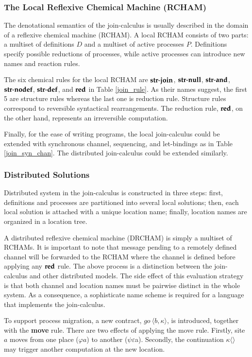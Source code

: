 \subsubsection{The Local Reflexive Chemical Machine (RCHAM)}

The denotational semantics of the join-calculus is usually described in the domain of a reflexive chemical machine (RCHAM).  A local RCHAM consists of two parts:  a multiset of definitions $D$ and a multiset of active processes $P$.  Definitions specify possible reductions of processes, while active processes can introduce new names and reaction rules.  

The six chemical rules for the local RCHAM are $\bf{str\text{-} join}$, $\bf{str\text{-}null}$, $\bf{str\text{-}and}$, $\bf{str\text{-}nodef}$, $\bf{str\text{-}def}$, and $\bf{red }$ in Table \ref{join_rule}.  As their names suggest, the first 5 are structure rules whereas the last one is reduction rule.  Structure rules correspond to reversible syntactical rearrangements.  The reduction rule, $\bf{red}$, on the other hand, represents an irreversible computation.

Finally, for the ease of writing programs, the local join-calculus could be extended with synchronous channel, sequencing, and let-bindings as in Table \ref{join_syn_chan}.  The distributed join-calculus could be extended similarly.

\subsubsection{Distributed Solutions}
Distributed system in the join-calculus is constructed in three steps: first, definitions and processes are partitioned into several local solutions; then, each local solution is attached with a unique location name; finally, location names are organized in a location tree.

A distributed reflexive chemical machine (DRCHAM) is simply a multiset of RCHAMs.  It is important to note that message pending to a remotely defined channel will be forwarded to the RCHAM where the channel is defined before applying any $\bf{red}$ rule.  The above process is a distinction  between the join-calculus and other distributed models.  The side effect of this evaluation strategy is that both channel and location names must be pairwise distinct in the whole system.  As a consequence, a sophisticate name scheme is required for a language that implements the join-calculus.

To support process migration, a new contract, $go \ \langle b,\kappa\rangle$, is introduced, together with the {\bf{move}} rule.  There are two effects of applying the move rule.  Firstly, site $a$ moves from one place ($\varphi a$) to another ($\psi\varepsilon$a).  Secondly, the continuation $\mathit{\kappa}\langle\rangle$ may trigger another computation at the new location.

